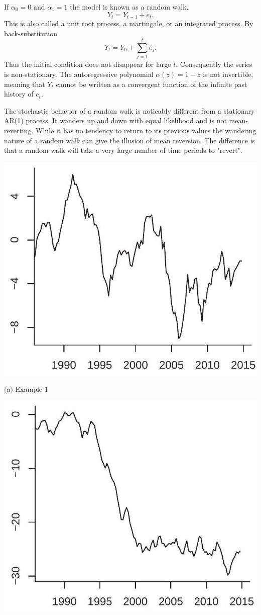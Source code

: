 \documentclass[10pt]{article}
\begin{document}
If $\alpha_{0}=0$ and $\alpha_{1}=1$ the model is known as a random walk.
$$
Y_{t}=Y_{t-1}+e_{t} .
$$
This is also called a unit root process, a martingale, or an integrated process. By back-substitution
$$
Y_{t}=Y_{0}+\sum_{j=1}^{t} e_{j} .
$$
Thus the initial condition does not disappear for large $t$. Consequently the series is non-stationary. The autoregressive polynomial $\alpha(z)=1-z$ is not invertible, meaning that $Y_{t}$ cannot be written as a convergent function of the infinite past history of $e_{t}$.

The stochastic behavior of a random walk is noticably different from a stationary AR(1) process. It wanders up and down with equal likelihood and is not mean-reverting. While it has no tendency to return to its previous values the wandering nature of a random walk can give the illusion of mean reversion. The difference is that a random walk will take a very large number of time periods to "revert".

\includegraphics[max width=\textwidth]{2022_10_23_6047885e7d154c9f28afg-27}

(a) Example 1

\includegraphics[max width=\textwidth]{2022_10_23_6047885e7d154c9f28afg-27(1)}
\end{document}
